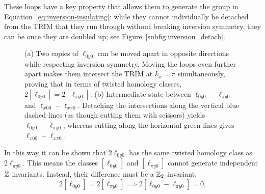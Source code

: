 These loops have a key property that allows them to generate the group in Equation~\eqref{eq:inversion-insulating}: while they cannot individually be detached from the TRIM that they run through without breaking inversion symmetry, they can be once they are doubled up; see Figure~\ref{subfig:inversion_detach}.
\begin{figure}[htb!]
	\centering
	\hfil
	\caption{(a) Two copies of $\ell_{0y0}$ can be moved apart in opposite directions while respecting inversion symmetry. Moving the loops even further apart makes them intersect the TRIM at $k_x=\pi$ simultaneously, proving that in terms of twisted homology classes, $2[\ell_{0y0}] = 2[\ell_{\pi y0}]$. (b) Intermediate state between $\ell_{0y0} - \ell_{\pi y0}$ and $\ell_{x00} - \ell_{x\pi0}$. Detaching the intersections along the vertical blue dashed lines (as though cutting them with scissors) yields $\ell_{0y0} - \ell_{\pi y0}$, whereas cutting along the horizontal green lines gives $\ell_{x00} - \ell_{x\pi0}$.}
	\label{fig:inversion_relations}
\end{figure}
In this way it can be shown that $2\ell_{0y0}$ has the same twisted homology class as $2\ell_{\pi y0}$. This means the classes $[\ell_{0y0}]$ and $[\ell_{\pi y0}]$ cannot generate independent $\mathbb{Z}$ invariants. Instead, their difference must be a $\mathbb{Z}_2$ invariant:
\begin{equation*}
	2[\ell_{0y0}] = 2[\ell_{\pi y0}] \implies 2 [\ell_{0y0} - \ell_{\pi y0}] = 0.
\end{equation*}

